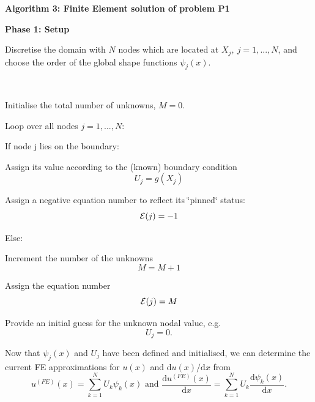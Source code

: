 \begin{center} {\bfseries  Algorithm 3\-: Finite Element solution of problem P1 } \end{center}  \par
 {\bfseries  Phase 1\-: Setup}
\begin{DoxyItemize}
\item Discretise the domain with $ N $ nodes which are located at $ X_j, \ j=1,...,N$, and choose the order of the global shape functions $ \psi_j(x).$ \begin{TabularC}{1}
\hline
\\
\end{TabularC}

\item Initialise the total number of unknowns, $M=0.$
\item Loop over all nodes $ j=1,...,N $\-:
\begin{DoxyItemize}
\item If node j lies on the boundary\-:
\begin{DoxyItemize}
\item Assign its value according to the (known) boundary condition \[ U_j = g(X_j) \]
\item Assign a negative equation number to reflect its \char`\"{}pinned\char`\"{} status\-: \[ {\cal E}(j) = -1 \]
\end{DoxyItemize}
\item Else\-:
\begin{DoxyItemize}
\item Increment the number of the unknowns \[ M=M+1 \]
\item Assign the equation number \[ {\cal E}(j) = M \]
\item Provide an initial guess for the unknown nodal value, e.\-g. \[ U_j=0. \]
\end{DoxyItemize}
\end{DoxyItemize}
\end{DoxyItemize}


\begin{DoxyItemize}
\item Now that $ \psi_j(x) $ and $ U_j $ have been defined and initialised, we can determine the current F\-E approximations for $ u(x)$ and $ \mbox{d} u(x)/\mbox{d} x$ from \[ u^{(FE)}(x) = \sum_{k=1}^{N} U_k \psi_k(x) \mbox{\ \ \ \ and \ \ \ \ } \frac{\mbox{d} u^{(FE)}(x)}{\mbox{d} x} = \sum_{k=1}^{N} U_k \frac{\mbox{d} \psi_k(x)}{\mbox{d} x}. \]
\end{DoxyItemize}

